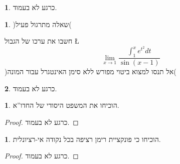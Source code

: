 \documentclass[english,hebrew]{article}
\theoremstyle{plain}
\theoremstyle{definition}
\newtheorem{xca}[thm]{\protect\exercisename}
\theoremstyle{definition}
\newtheorem*{sol*}{\protect\solutionname}
\providecommand{\exercisename}{תרגיל}
\providecommand{\solutionname}{פתרון}
\begin{document}
\begin{sol*}
כרגע לא בעמוד.
\end{sol*}
\begin{xca}
)שאלה מתרגול פעיל(

חשבו את ערכו של הגבול \L{%
\[
\lim_{x\to1}\frac{\int_{1}^{x}e^{t^{2}}dt}{\sin(x-1)}
\]
}%
)אל תנסו למצוא ביטוי מפורש ללא סימן האינטגרל עבור המונה(
\end{xca}

\begin{sol*}
כרגע לא בעמוד.
\end{sol*}
\begin{xca}
הוכיחו את המשפט היסודי של החדו\textquotedblright א.
\end{xca}

\begin{proof}
כרגע לא בעמוד.
\end{proof}
\begin{xca}
הוכיחו כי פונקציית רימן רציפה בכל נקודה אי-רציונלית.
\end{xca}

\begin{proof}
כרגע לא בעמוד.
\end{proof}
\end{document}
